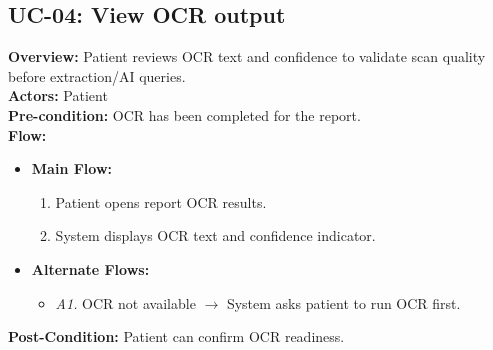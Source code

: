 \documentclass[12pt, a4paper]{article}
\begin{document}
\subsection*{UC-04: View OCR output}
\textbf{Overview:} Patient reviews OCR text and confidence to validate scan quality before extraction/AI queries. \\
\textbf{Actors:} Patient \\
\textbf{Pre-condition:} OCR has been completed for the report. \\
\textbf{Flow:}
\begin{itemize}[leftmargin=*]
    \item \textbf{Main Flow:}
    \begin{enumerate}
        \item Patient opens report OCR results.
        \item System displays OCR text and confidence indicator.
    \end{enumerate}
    \item \textbf{Alternate Flows:}
    \begin{itemize}
        \item \textit{A1.} OCR not available $\rightarrow$ System asks patient to run OCR first.
    \end{itemize}
\end{itemize}
\textbf{Post-Condition:} Patient can confirm OCR readiness.
\end{document}
